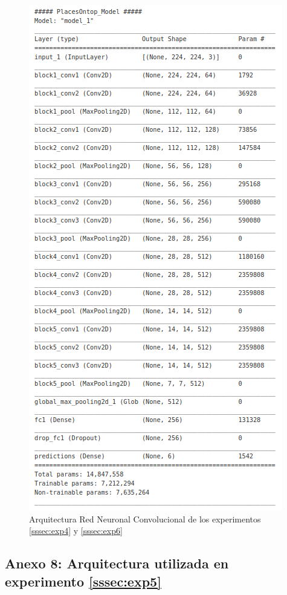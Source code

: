 \begin{figure}[h!]
	\centering
	\includegraphics[width=0.7\linewidth]{images/architecture_exp4_6_cnn}
	\caption{Arquitectura Red Neuronal Convolucional de los experimentos \ref{sssec:exp4} y \ref{sssec:exp6} }
	\label{fig:architectureexp4_6}
\end{figure}


\subsection{Anexo 8: Arquitectura utilizada en experimento \ref{sssec:exp5}}\label{ssec:anexo8}

